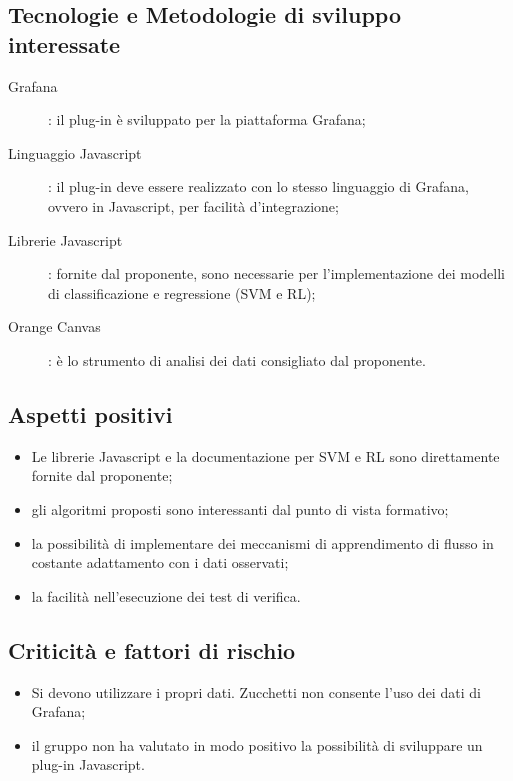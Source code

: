 \documentclass[../studio-di-fattibilita.tex]{subfiles}
\begin{document}
  \subsection{Tecnologie e Metodologie di sviluppo interessate}%
  \label{subsec:tecnologie_interessate}
  \begin{description}
    \item [Grafana]: il plug-in è sviluppato per la piattaforma Grafana;
    \item [Linguaggio Javascript]: il plug-in deve essere realizzato con lo stesso linguaggio di Grafana, ovvero in Javascript, per facilità d'integrazione;
    \item [Librerie Javascript]: fornite dal proponente, sono necessarie per l'implementazione dei modelli di classificazione e regressione (SVM e RL);
    \item [Orange Canvas]: è lo strumento di analisi dei dati consigliato dal proponente.
  \end{description}


  \subsection{Aspetti positivi}%
  \label{subsec:aspetti_positivi}
  \begin{itemize}
    \item Le librerie Javascript e la documentazione per SVM e RL sono direttamente fornite dal proponente;
    \item gli algoritmi proposti sono interessanti dal punto di vista formativo;
    \item la possibilità di implementare dei meccanismi di apprendimento di flusso in costante adattamento con i dati osservati;
    \item la facilità nell'esecuzione dei test di verifica.
  \end{itemize}


  \subsection{Criticità e fattori di rischio}%
  \label{subsec:criticita_e_fattori_di_rischio}
  \begin{itemize}
    \item Si devono utilizzare i propri dati. Zucchetti non consente l'uso dei dati di Grafana;
    \item il gruppo non ha valutato in modo positivo la possibilità di sviluppare un plug-in Javascript.
  \end{itemize}
\end{document}
